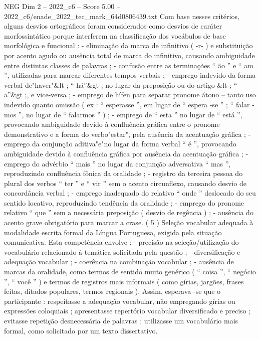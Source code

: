 \begin{textsample}{NEG Dim 2 – 2022\_c6 – Score 5.00 – 2022\_c6/enade\_2022\_tec\_mark\_64d0806439.txt}
Com base nesses critérios, alguns desvios ortográficos foram considerados como desvios de caráter morfossintático porque interferem na classificação dos vocábulos de base morfológica e funcional : - eliminação da marca de infinitivo ( -r- ) e substituição por acento agudo ou ausência total de marca do infinitivo, causando ambiguidade entre distintas classes de palavras ; - confusão entre as terminações “ ão ” e “ am ”, utilizadas para marcar diferentes tempos verbais ; - emprego indevido da forma verbal de"haver"\&lt ; “ há”\&gt ; no lugar da preposição ou do artigo \&lt ; “ a”\&gt ;, e vice-versa ; - emprego de hífen para separar pronome átono – tanto uso indevido quanto omissão ( ex : “ esperasse ”, em lugar de “ espera -se ” ; “ falar -mos ”, no lugar de “ falarmos ” ) ; - emprego de “ esta ” no lugar de “ está ”, provocando ambiguidade devido à confluência gráfica entre o pronome demonstrativo e a forma do verbo"estar", pela ausência da acentuação gráfica ; - emprego da conjunção aditiva"e"no lugar da forma verbal “ é ”, provocando ambiguidade devido à confluência gráfica por ausência da acentuação gráfica ; - emprego do advérbio “ mais ” no lugar da conjunção adversativa “ mas ”, reproduzindo confluência fônica da oralidade ; - registro da terceira pessoa do plural dos verbos “ ter ” e “ vir ” sem o acento circunflexo, causando desvio de concordância verbal ; - emprego inadequado do relativo “ onde ” deslocado do seu sentido locativo, reproduzindo tendência da oralidade ; - emprego do pronome relativo “ que ” sem a necessária preposição ( desvio de regência ) ; - ausência do acento grave obrigatório para marcar a crase. ( 5 ) Seleção vocabular adequada à modalidade escrita formal da Língua Portuguesa, exigida pela situação comunicativa.
Esta competência envolve : - precisão na seleção/utilização do vocabulário relacionado à temática solicitada pela questão ; - diversificação e adequação vocabular ; - coerência na combinação vocabular ; - ausência de marcas da oralidade, como termos de sentido muito genérico ( “ coisa ”, “ negócio ”, “ você ” ) e termos de registros mais informais ( como gírias, jargões, frases feitas, ditados populares, termos regionais ).
Assim, esperava -se que o participante : respeitasse a adequação vocabular, não empregando gírias ou expressões coloquiais ; apresentasse repertório vocabular diversificado e preciso ; evitasse repetição desnecessária de palavras ; utilizasse um vocabulário mais formal, como solicitado por um texto dissertativo.

\end{textsample}
